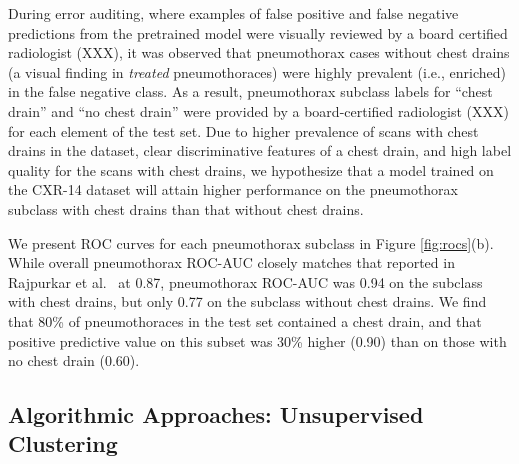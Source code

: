 \documentclass{article}
\begin{document}
During error auditing, where examples of false positive and false negative predictions from the pretrained model were visually reviewed by a board certified radiologist (XXX),
it was observed that pneumothorax cases without chest drains (a visual finding in \textit{treated} pneumothoraces) were highly prevalent (i.e., enriched) in the false negative class.
 As a result, pneumothorax subclass labels for ``chest drain'' and ``no chest drain'' were provided by a board-certified radiologist (XXX) for each element of the test set.  
 Due to higher prevalence of scans with chest drains in the dataset, clear discriminative features of a chest drain, and high label quality for the scans with chest drains, we hypothesize that a model trained on the CXR-14 dataset will attain higher performance on the pneumothorax subclass with chest drains than that without chest drains.  
 

We present ROC curves for each pneumothorax subclass in Figure \ref{fig:rocs}(b).  
While overall pneumothorax ROC-AUC closely matches that reported in Rajpurkar et al.~\citep{rajpurkar2017chexnet} at 0.87, pneumothorax ROC-AUC was 0.94 on the subclass with chest drains, but only 0.77 on the subclass without chest drains.  
We find that 80\% of pneumothoraces in the test set contained a chest drain, and that positive predictive value on this subset was 30\% higher (0.90) than on those with no chest drain (0.60).  

\subsection{Algorithmic Approaches: Unsupervised Clustering}
\end{document}
